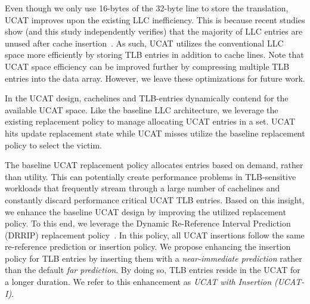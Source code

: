 Even though we only use 16-bytes of the 32-byte line to store the
translation, UCAT improves upon the existing LLC inefficiency. This is
because recent studies show (and this study independently verifies)
that the majority of LLC entries are unused after cache
insertion~\cite{jaleel_rrip,setdueling,wu2011,jimenez_micro2013,khan2010}.
As such, UCAT utilizes the conventional LLC space more efficiently by
storing TLB entries in addition to cache lines. Note that UCAT space
efficiency can be improved further by compressing multiple TLB entries
into the data array. However, we leave these optimizations for future
work.

In the UCAT design, cachelines and TLB-entries dynamically contend for
the available UCAT space. Like the baseline LLC architecture, we
leverage the existing replacement policy to manage allocating UCAT
entries in a set. UCAT hits update replacement state while UCAT misses
utilize the baseline replacement policy to select the victim.

The baseline UCAT replacement policy allocates entries based on
demand, rather than utility. This can potentially create performance
problems in TLB-sensitive workloads that frequently stream through a
large number of cachelines and constantly discard performance critical
UCAT TLB entries. Based on this insight, we enhance the baseline UCAT
design by improving the utilized replacement policy. To this end, we
leverage the Dynamic Re-Reference Interval Prediction (DRRIP)
replacement policy~\cite{jaleel_rrip}. In this policy, all UCAT
insertions follow the same re-reference prediction or insertion
policy. We propose enhancing the insertion policy for TLB entries by
inserting them with a {\em near-immediate prediction} rather than the
default {\em far prediction}. By doing so, TLB entries reside in the
UCAT for a longer duration. We refer to this enhancement as {\em UCAT
with Insertion (UCAT-I)}.

% 
% 

